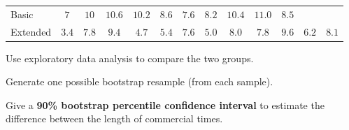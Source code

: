 \begin{center}
\begin{tabular}{l|cccccccccccc}
\hline
Basic & $7$& $10$ & $10.6$ & $10.2$ & $8.6$ & $7.6$ & $8.2$ & $10.4$ & $11.0$ & $8.5$\\
Extended & $3.4$ & $7.8$ & $9.4$ & $4.7$ & $5.4$ & $7.6$ & $5.0$ & $8.0$ & $7.8$ & $9.6$ & $6.2$ & $8.1$\\
\hline
\end{tabular}
\end{center}

\bb
\ii Use exploratory data analysis to compare the two groups. \vfill







\ii Generate one possible bootstrap resample (from each sample). \vfill

\ii Give a  \textbf{90\% bootstrap percentile confidence interval}  to estimate the difference between the length of commercial times. \vfill

